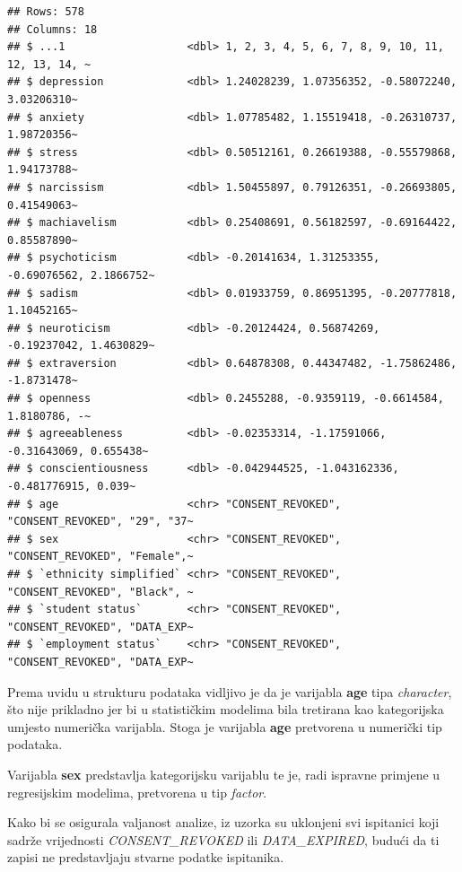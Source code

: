\documentclass[
]{article}
\begin{document}
\begin{verbatim}
## Rows: 578
## Columns: 18
## $ ...1                   <dbl> 1, 2, 3, 4, 5, 6, 7, 8, 9, 10, 11, 12, 13, 14, ~
## $ depression             <dbl> 1.24028239, 1.07356352, -0.58072240, 3.03206310~
## $ anxiety                <dbl> 1.07785482, 1.15519418, -0.26310737, 1.98720356~
## $ stress                 <dbl> 0.50512161, 0.26619388, -0.55579868, 1.94173788~
## $ narcissism             <dbl> 1.50455897, 0.79126351, -0.26693805, 0.41549063~
## $ machiavelism           <dbl> 0.25408691, 0.56182597, -0.69164422, 0.85587890~
## $ psychoticism           <dbl> -0.20141634, 1.31253355, -0.69076562, 2.1866752~
## $ sadism                 <dbl> 0.01933759, 0.86951395, -0.20777818, 1.10452165~
## $ neuroticism            <dbl> -0.20124424, 0.56874269, -0.19237042, 1.4630829~
## $ extraversion           <dbl> 0.64878308, 0.44347482, -1.75862486, -1.8731478~
## $ openness               <dbl> 0.2455288, -0.9359119, -0.6614584, 1.8180786, -~
## $ agreeableness          <dbl> -0.02353314, -1.17591066, -0.31643069, 0.655438~
## $ conscientiousness      <dbl> -0.042944525, -1.043162336, -0.481776915, 0.039~
## $ age                    <chr> "CONSENT_REVOKED", "CONSENT_REVOKED", "29", "37~
## $ sex                    <chr> "CONSENT_REVOKED", "CONSENT_REVOKED", "Female",~
## $ `ethnicity simplified` <chr> "CONSENT_REVOKED", "CONSENT_REVOKED", "Black", ~
## $ `student status`       <chr> "CONSENT_REVOKED", "CONSENT_REVOKED", "DATA_EXP~
## $ `employment status`    <chr> "CONSENT_REVOKED", "CONSENT_REVOKED", "DATA_EXP~
\end{verbatim}

Prema uvidu u strukturu podataka vidljivo je da je varijabla
\textbf{age} tipa \emph{character}, što nije prikladno jer bi u
statističkim modelima bila tretirana kao kategorijska umjesto numerička
varijabla. Stoga je varijabla \textbf{age} pretvorena u numerički tip
podataka.

Varijabla \textbf{sex} predstavlja kategorijsku varijablu te je, radi
ispravne primjene u regresijskim modelima, pretvorena u tip
\emph{factor}.

Kako bi se osigurala valjanost analize, iz uzorka su uklonjeni svi
ispitanici koji sadrže vrijednosti \emph{CONSENT\_REVOKED} ili
\emph{DATA\_EXPIRED}, budući da ti zapisi ne predstavljaju stvarne
podatke ispitanika.
\end{document}
